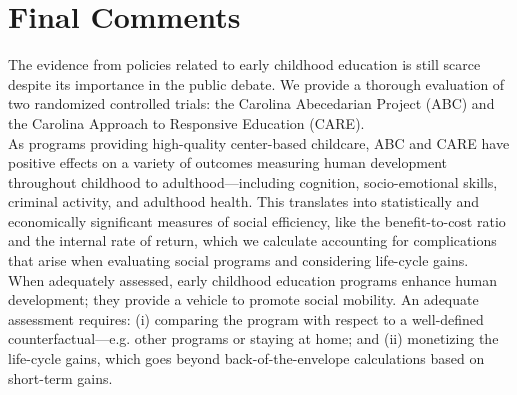 \section{Final Comments} \label{section:conclusion}

\noindent The evidence from policies related to early childhood education is still scarce despite its importance in the public debate. We provide a thorough evaluation of two randomized controlled trials: the Carolina Abecedarian Project (ABC) and the Carolina Approach to Responsive Education (CARE).\\ 

\noindent As programs providing high-quality center-based childcare, ABC and CARE have positive effects on a variety of outcomes measuring human development throughout childhood to adulthood---including cognition, socio-emotional skills, criminal activity, and adulthood health. This translates into statistically and economically significant measures of social efficiency, like the benefit-to-cost ratio and the internal rate of return, which we calculate accounting for complications that arise when evaluating social programs and considering life-cycle gains.\\

\noindent When adequately assessed, early childhood education programs enhance human development; they provide a vehicle to promote social mobility. An adequate assessment requires: (i) comparing the program with respect to a well-defined counterfactual---e.g. other programs or staying at home; and (ii) monetizing the life-cycle gains, which goes beyond back-of-the-envelope calculations based on short-term gains. 

\singlespace



 